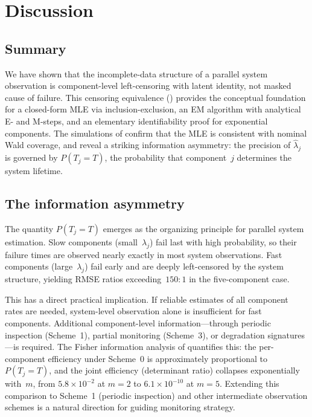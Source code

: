 \section{Discussion}
\label{sec:discussion}

\subsection{Summary}

We have shown that the incomplete-data structure of a parallel system
observation is component-level left-censoring with latent identity,
not masked cause of failure.  This censoring equivalence
() provides the conceptual foundation for
a closed-form MLE via inclusion-exclusion, an EM algorithm with
analytical E- and M-steps, and an elementary identifiability proof for
exponential components.  The simulations of 
confirm that the MLE is consistent with nominal Wald coverage, and
reveal a striking information asymmetry: the precision of
$\hat\lambda_j$ is governed by $P(T_j = T)$, the probability that
component~$j$ determines the system lifetime.

\subsection{The information asymmetry}

The quantity $P(T_j = T)$ emerges as the organizing principle for
parallel system estimation.  Slow components (small~$\lambda_j$) fail
last with high probability, so their failure times are observed nearly
exactly in most system observations.  Fast components (large~$\lambda_j$)
fail early and are deeply left-censored by the system structure, yielding
RMSE ratios exceeding~$150{:}1$ in the five-component case.

This has a direct practical implication.  If reliable estimates of all
component rates are needed, system-level observation alone is
insufficient for fast components.  Additional component-level
information---through periodic inspection (Scheme~1), partial
monitoring (Scheme~3), or degradation signatures---is required.  The
Fisher information analysis of  quantifies
this: the per-component efficiency under Scheme~0 is approximately
proportional to $P(T_j = T)$, and the joint efficiency (determinant
ratio) collapses exponentially with~$m$, from $5.8 \times 10^{-2}$ at
$m = 2$ to $6.1 \times 10^{-10}$ at $m = 5$.  Extending this
comparison to Scheme~1 (periodic inspection) and other intermediate
observation schemes is a natural direction for guiding monitoring
strategy.


